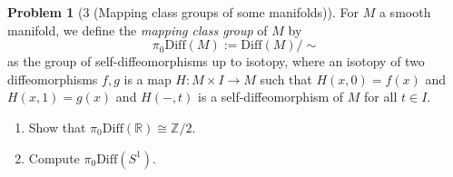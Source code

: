 \documentclass[reqno]{amsart}
\theoremstyle{definition}
\newtheorem{problem}[theorem]{Problem}
\theoremstyle{remark}
\newcommand{\Diff}{{\mathrm{Diff}}}
\begin{document}
    \begin{problem}[3 (Mapping class groups of some manifolds)]
        For $M$ a smooth manifold, we define the 
        \textit{mapping class group} of $M$ by
        \[
        \pi_0 \Diff (M) := \Diff (M) / \sim
        \] 
        as the group of self-diffeomorphisms
        up to isotopy, where an isotopy of two
        diffeomorphisms $f,g$ is a map
        $H \colon M \times I \to M$ such that
        $H(x,0) = f(x)$ and
        $H(x,1) = g(x)$ and
        $H(-,t)$ is a self-diffeomorphism of
        $M$ for all $t \in I$.
        \begin{enumerate}
            \item Show that
                $\pi_0 \Diff (\mathbb{R}) 
                \cong \mathbb{Z}/2$.
            \item Compute
                $\pi_0 \Diff \left( S^{1} \right) $.
        \end{enumerate}
    \end{problem}
\end{document}
